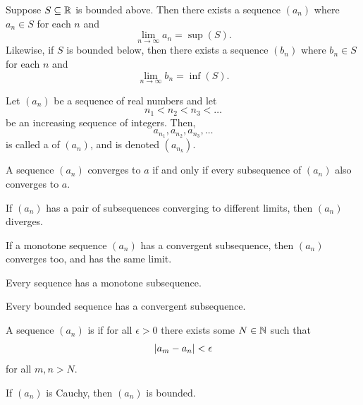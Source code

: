 \documentclass[11pt,twoside=off,numbers=noenddot]{scrbook}
\begin{document}
\begin{proposition}
  Suppose $S \subseteq \mathbb R$ is bounded above. Then there exists a
  sequence $(a_n)$ where $a_n \in S$ for each $n$ and
  \[ \lim_{n \to \infty} a_n = \sup(S). \]
  Likewise, if $S$ is bounded below, then there exists a sequence
  $(b_n)$ where $b_n \in S$ for each $n$ and
  \[ \lim_{n \to \infty} b_n = \inf(S). \]
\end{proposition}

\begin{definition}
  Let $(a_n)$ be a sequence of real numbers and let
  \[ n_1 < n_2 < n_3 < \dots \]
  be an increasing sequence of integers. Then,
  \[ a_{n_1}, a_{n_2}, a_{n_3}, \dots \]
  is called a  of $(a_n)$, and is denoted $(a_{n_k})$.
\end{definition}

\begin{proposition}
  A sequence $(a_n)$ converges to $a$ if and only if every
  subsequence of $(a_n)$ also converges to $a$.
\end{proposition}

\begin{corollary}
  If $(a_n)$ has a pair of subsequences converging to different
  limits, then $(a_n)$ diverges.
\end{corollary}

\begin{proposition}
  If a monotone sequence $(a_n)$ has a convergent subsequence, then
  $(a_n)$ converges too, and has the same limit.
\end{proposition}

\begin{lemma}
  Every sequence has a monotone subsequence.
\end{lemma}

\begin{theorem}
  Every bounded sequence has a convergent subsequence.
\end{theorem}

\begin{definition}
  A sequence $(a_n)$ is  if for all $\epsilon > 0$
  there exists some $N \in \mathbb N$ such that
  \[ | a_m - a_n | < \epsilon \]
  for all $m, n > N$.
\end{definition}

\begin{lemma}
  If $(a_n)$ is Cauchy, then $(a_n)$ is bounded.
\end{lemma}
\end{document}
